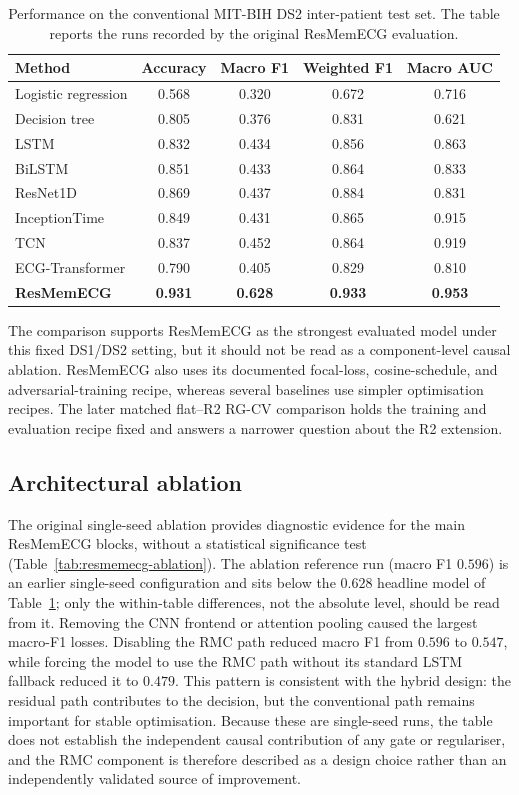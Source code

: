 \documentclass[review,12pt]{elsarticle}
\begin{document}
\begin{table}[htbp]
\caption{Performance on the conventional MIT-BIH DS2 inter-patient test set.
The table reports the runs recorded by the original ResMemECG evaluation.}
\label{tab:performance}
\centering
\begin{tabular}{@{}lcccc@{}}
\toprule
Method & Accuracy & Macro F1 & Weighted F1 & Macro AUC \\
\midrule
Logistic regression & 0.568 & 0.320 & 0.672 & 0.716 \\
Decision tree & 0.805 & 0.376 & 0.831 & 0.621 \\
LSTM & 0.832 & 0.434 & 0.856 & 0.863 \\
BiLSTM & 0.851 & 0.433 & 0.864 & 0.833 \\
ResNet1D & 0.869 & 0.437 & 0.884 & 0.831 \\
InceptionTime~\cite{ref27} & 0.849 & 0.431 & 0.865 & 0.915 \\
TCN & 0.837 & 0.452 & 0.864 & 0.919 \\
ECG-Transformer & 0.790 & 0.405 & 0.829 & 0.810 \\
\textbf{ResMemECG} & \textbf{0.931} & \textbf{0.628} & \textbf{0.933} & \textbf{0.953} \\
\bottomrule
\end{tabular}
\end{table}

The comparison supports ResMemECG as the strongest evaluated model under this
fixed DS1/DS2 setting, but it should not be read as a component-level causal
ablation. ResMemECG also uses its documented focal-loss, cosine-schedule, and
adversarial-training recipe, whereas several baselines use simpler optimisation
recipes. The later matched flat--R2 RG-CV comparison holds the training and
evaluation recipe fixed and answers a narrower question about the R2 extension.

\subsection{Architectural ablation}
The original single-seed ablation provides diagnostic evidence for the main
ResMemECG blocks, without a statistical significance test
(Table~\ref{tab:resmemecg-ablation}). The ablation reference run (macro F1
$0.596$) is an earlier single-seed configuration and sits below the $0.628$
headline model of Table~\ref{tab:performance}; only the within-table differences,
not the absolute level, should be read from it. Removing the CNN frontend or
attention pooling caused the largest macro-F1 losses. Disabling the RMC path
reduced macro F1 from $0.596$ to $0.547$, while forcing the model to use the RMC
path without its standard LSTM fallback reduced it to $0.479$. This pattern is
consistent with the hybrid design: the residual path contributes to the
decision, but the conventional path remains important for stable optimisation.
Because these are single-seed runs, the table does not establish the
independent causal contribution of any gate or regulariser, and the RMC
component is therefore described as a design choice rather than an independently
validated source of improvement.
\end{document}
